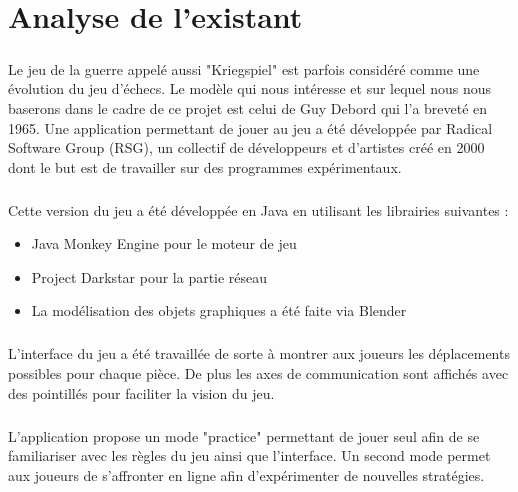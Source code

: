\chapter{Analyse de l'existant}

	\paragraph{}
	Le jeu de la guerre appelé aussi "Kriegspiel" est parfois considéré comme une évolution du jeu d'échecs.
	Le modèle qui nous intéresse et sur lequel nous nous baserons dans le cadre de ce projet est celui de Guy Debord qui l'a breveté en 1965.
	Une application permettant de jouer au jeu a été développée par Radical Software Group (RSG), un collectif de développeurs et d'artistes 
	créé en 2000 dont le but est de travailler sur des programmes expérimentaux.
	
	\paragraph{}
	Cette version du jeu a été développée en Java en utilisant les librairies suivantes :
	
	\begin{itemize}
		\item Java Monkey Engine pour le moteur de jeu
		\item Project Darkstar pour la partie réseau
		\item La modélisation des objets graphiques a été faite via Blender
	\end{itemize}

	\paragraph{}
	L'interface du jeu a été travaillée de sorte à montrer aux joueurs les déplacements possibles pour chaque pièce. De plus les axes de 
	communication sont affichés avec des pointillés pour faciliter la vision du jeu.
	
	\paragraph{}
	L'application propose un mode "practice" permettant de jouer seul afin de se familiariser avec les règles du jeu ainsi que l'interface.
	Un second mode permet aux joueurs de s'affronter en ligne afin d'expérimenter de nouvelles stratégies.
	
